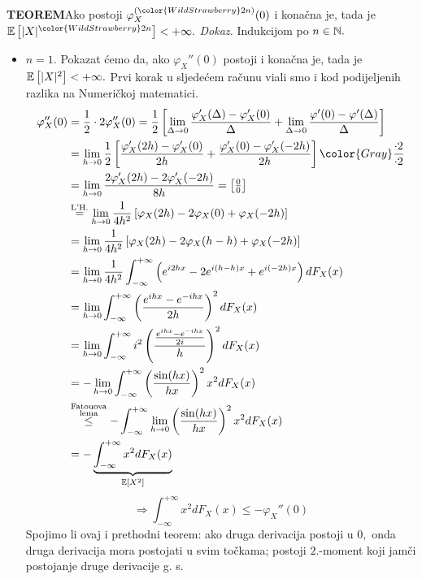 \documentclass{article}
\begin{document}
\textbf{TEOREM}\newline Ako postoji \(\varphi_X^{({\color{WildStrawberry}2n})}(0)\) i konačna je, tada je \(\Bbb E\left[|X|^{\color{WildStrawberry}2n}\right]<+\infty.\)\newline\newline
\textit{Dokaz.}\newline
Indukcijom po \(n\in\Bbb N.\) 
\begin{itemize}
    \item[\ding{228}] \(n=1.\) Pokazat ćemo da, ako \(\varphi_X''(0)\) postoji i konačna je, tada je \(\Bbb E\left[|X|^2\right]<+\infty.\) Prvi korak u sljedećem računu vi\dj{}ali smo i kod podijeljenih razlika na Numeričkoj matematici. \[\begin{aligned}\varphi_X''(0)&=\frac12\cdot2\varphi_X''(0)=\frac12\left[\lim_{\Delta\to0}\frac{\varphi_X'(\Delta)-\varphi_X'(0)}\Delta+\lim_{\Delta\to0}\frac{\varphi'(0)-\varphi'(\Delta)}\Delta\right]\\&=\lim_{h\to 0}\frac12\left[\frac{\varphi_X'(2h)-\varphi_X'(0)}{2h}+\frac{\varphi_X'(0)-\varphi_X'(-2h)}{2h}\right]{\color{Gray}\frac{\cdot2}{\cdot2}}\\&=\lim_{h\to 0}\frac{2\varphi_X'(2h)-2\varphi_X'(-2h)}{8h}=\begin{bmatrix}\frac00\end{bmatrix}\\&\overset{\text{L'H.}}{=}\lim_{h\to 0}\frac1{4h^2}\left[\varphi_X(2h)-2\varphi_X(0)+\varphi_X(-2h)\right]\\&=\lim_{h\to 0}\frac1{4h^2}\left[\varphi_X(2h)-2\varphi_X(h-h)+\varphi_X(-2h)\right]\\&=\lim_{h\to0}\frac1{4h^2}\int_{-\infty}^{+\infty}\left(e^{i2hx}-2e^{i(h-h)x}+e^{i(-2h)x}\right)dF_X(x)\\&=\lim_{h\to 0}\int_{-\infty}^{+\infty}\left(\frac{e^{ihx}-e^{-ihx}}{2h}\right)^2dF_X(x)\\&=\lim_{h\to 0}\int_{-\infty}^{+\infty}i^2\left(\frac{\frac{e^{ihx}-e^{-ihx}}{2i}}{h}\right)^2dF_X(x)\\&=-\lim_{h\to 0}\int_{-\infty}^{+\infty}\left(\frac{\sin(hx)}{hx}\right)^2x^2dF_X(x)\\&\overset{\substack{\text{Fatouova}\\\text{lema}}}{\le}-\int_{-\infty}^{+\infty}\lim_{h\to 0}\left(\frac{\sin(hx)}{hx}\right)^2x^2dF_X(x)\\&=-\underbrace{\int_{-\infty}^{+\infty}x^2dF_X(x)}_{\Bbb E[X^2]}\end{aligned}\] \[\Rightarrow\int_{-\infty}^{+\infty}x^2dF_X(x)\le-\varphi_X''(0)\] Spojimo li ovaj i prethodni teorem: ako druga derivacija postoji u \(0,\) onda druga derivacija mora postojati u svim točkama; postoji \(2.\)-moment koji jamči postojanje druge derivacije g. s.

\end{itemize}
\end{document}
